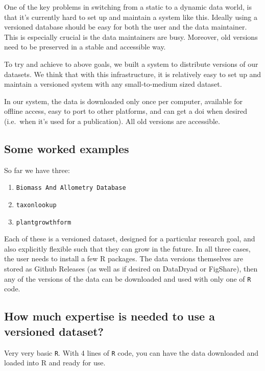 \documentclass[a4paper,11pt]{article}
\begin{document}
One of the key problems in switching from a static to a dynamic data
world, is that it's currently hard to set up and maintain a system like
this. Ideally using a versioned database should be easy for both the
user and the data maintainer. This is especially crucial is the data
maintainers are busy. Moreover, old versions need to be preserved in a
stable and accessible way.

To try and achieve to above goals, we built a system to distribute
versions of our datasets. We think that with this infrastructure, it is
relatively easy to set up and maintain a versioned system with any
small-to-medium sized dataset.

In our system, the data is downloaded only once per computer, available
for offline access, easy to port to other platforms, and can get a doi
when desired (i.e.~when it's used for a publication). All old versions
are accessible.

\subsection{Some worked examples}

So far we have three:

\begin{enumerate}
\def\labelenumi{\arabic{enumi}.}
\itemsep1pt\parskip0pt
\item
  \texttt{Biomass And Allometry Database} \citep{Falster-2015}
\item
  \texttt{taxonlookup} \citep{Pennell-2015a}
\item
  \texttt{plantgrowthform}
\end{enumerate}

Each of these is a versioned dataset, designed for a particular research
goal, and also explicitly flexible such that they can grow in the
future. In all three cases, the user needs to install a few R packages.
The data versions themselves are stored as Github Releases (as well as
if desired on DataDryad or FigShare), then any of the versions of the
data can be downloaded and used with only one of \texttt{R} code.

\subsection{How much expertise is needed to use a versioned
dataset?}

Very very basic \texttt{R}. With 4 lines of \texttt{R} code, you can
have the data downloaded and loaded into R and ready for use.
\end{document}
